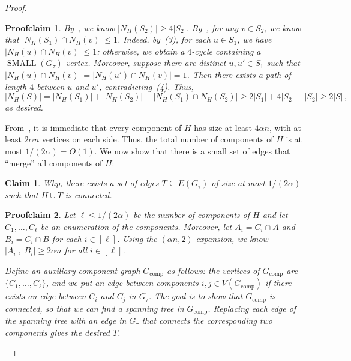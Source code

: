 \documentclass[10pt,a4paper]{amsart}
\newtheorem{claim}{Claim}
\newtheorem{proofclaim}{Proofclaim}
\newcommand{\SMA}{\operatorname{SMALL}}
\begin{document}
\begin{proof}
\begin{proofclaim}
        By~, we know $|N_{H}(S_2)|\geq 4|S_2|$. By~, for any $v\in S_2$, we know that $|N_{H}(S_1)\cap N_{H}(v)|\leq 1$.
        Indeed, by~(3), for each $u \in S_1$, we have $|N_H(u)\cap N_H(v)|\leq 1$; otherwise, we obtain a $4$-cycle containing a $\SMA(G_\tau)$ vertex. Moreover, suppose there are distinct $u,u'\in S_1$ such that $|N_H(u)\cap N_H(v)| = |N_H(u')\cap N_H(v)| =  1$. Then there exists a path of length $4$ between $u$ and $u'$, contradicting~(4).
        Thus, $$|N_H(S)| = |N_H(S_1)| + |N_H(S_2)| - |N_H(S_1)\cap N_H(S_2)| \geq 2|S_1| + 4|S_2| - |S_2| \geq 2|S|\,,$$
        as desired.
    \end{proofclaim}
    From~, it is immediate that every component of $H$ has size at least $4\alpha n$, with at least $2\alpha n$ vertices on each side.
    Thus, the total number of components of $H$ is at most $1/(2\alpha) = O(1)$.
    We now show that there is a small set of edges that ``merge'' all components of $H$:
    \begin{claim}
        Whp, there exists a set of edges $T\subseteq E(G_\tau)$ of size at most $1/(2\alpha)$ such that $H\cup T$ is connected.
    \end{claim}
    \begin{proofclaim}
        Let $\ell\leq 1/(2\alpha)$ be the number of components of $H$ and let $C_1,\dots, C_\ell$ be an enumeration of the components. Moreover, let $A_i = C_i\cap A$ and $B_i = C_i\cap B$ for each $i\in [\ell]$. Using the $(\alpha n,2)$-expansion, we know $|A_i|,|B_i|\geq 2\alpha n$ for all $i\in [\ell]$.

        Define an auxiliary component graph $G_{\mathrm{comp}}$ as follows: the vertices of $G_{\mathrm{comp}}$ are $\{C_1,\dots, C_\ell\}$, and we put an edge between components $i,j\in V(G_{\mathrm{comp}})$ if there exists an edge between $C_i$ and $C_j$ in $G_\tau$. The goal is to show that $G_{\mathrm{comp}}$ is connected, so that we can find a spanning tree in $G_{\mathrm{comp}}$. Replacing each edge of the spanning tree with an edge in $G_\tau$ that connects the corresponding two components gives the desired $T$.


\end{proofclaim}
\end{proof}
\end{document}
